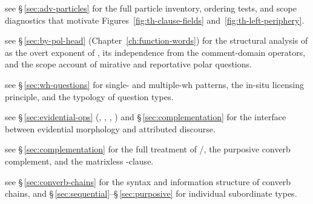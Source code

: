 \begin{description}[leftmargin=2em, labelwidth=!, labelindent=0em]
\item[\upshape Left-periphery structure (§\,\ref{sec:th-left-periphery}):] see
	§\,\ref{sec:adv-particles} for the full particle inventory, ordering tests,
	and scope diagnostics that motivate Figures~\ref{fig:th-clause-fields}
	and~\ref{fig:th-left-periphery}.
\item[\upshape Polar questions (§\,\ref{sec:th-polar-questions}):] see
	§\,\ref{sec:by-pol-head} (Chapter~\ref{ch:function-words}) for the
	structural analysis of  as the overt exponent of
	, its independence from the
	comment-domain operators, and the scope account of mirative and
	reportative polar questions.
\item[\upshape \textit{Wh}-interrogation (§\,\ref{sec:th-wh-interrogation}):] see
	§\,\ref{sec:wh-questions} for single- and multiple-wh patterns, the
	in-situ licensing principle, and the typology of question types.
\item[\upshape Evidential particles (§\,\ref{sec:th-evidential}):] see
	§\,\ref{sec:evidential-ops} (, , ,
	) and §\,\ref{sec:complementation} for the interface between
	evidential morphology and attributed discourse.
\item[\upshape Complementation (§\,\ref{sec:th-complementation}):] see
	§\,\ref{sec:complementation} for the full treatment of /,
	the purposive converb complement, and the matrixless -clause.
\item[\upshape Head-finality and subordination (§\,\ref{sec:th-subord-headfinal}):] see
	§\,\ref{sec:converb-chains} for the syntax and information structure of
	converb chains, and §\,\ref{sec:sequential}--§\,\ref{sec:purposive} for
	individual subordinate types.
\end{description}
